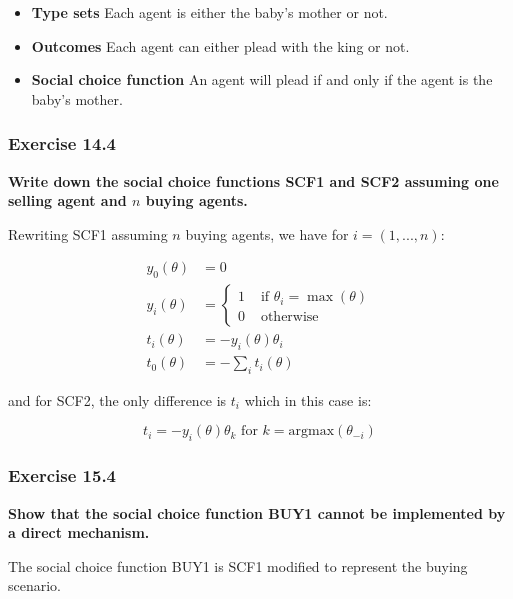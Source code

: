 \documentclass[12pt, a4paper]{article}
\begin{document}
\begin{itemize}
	\item \textbf{Type sets}
	Each agent is either the baby's mother or not.
	\item \textbf{Outcomes}
	Each agent can either plead with the king or not.
	\item \textbf{Social choice function}
	An agent will plead if and only if the agent is the baby's mother.
\end{itemize}


\subsubsection*{Exercise 14.4}

\textbf{Write down the social choice functions SCF1 and SCF2 assuming one selling agent and $n$ buying agents.}

Rewriting SCF1 assuming $n$ buying agents, we have for $i = (1,...,n)$:

\begin{align*}
	y_0(\theta) &= 0 \\
	y_i(\theta) &=
		\begin{cases}
			1 & \text{ if } \theta_i = \max(\theta)	\\
			0 & \text{ otherwise}
		\end{cases} \\
	t_i(\theta) &= -y_i(\theta) \theta_i \\
	t_0(\theta) &= -\sum_i t_i(\theta)
\end{align*}

and for SCF2, the only difference is $t_i$ which in this case is:

\begin{equation*}
	t_i = -y_i(\theta) \theta_k \text{ for } k=\text{argmax}(\theta_{-i})
\end{equation*}


\subsubsection*{Exercise 15.4}

\textbf{Show that the social choice function BUY1 cannot be implemented by a direct mechanism.}

The social choice function BUY1 is SCF1 modified to represent the buying scenario.
\end{document}
